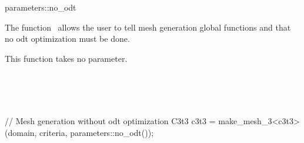 \ccRefPageBegin


\begin{ccRefFunction}{parameters::no_odt}  %


\ccDefinition
  
The function \ccRefName\ allows the user to tell mesh generation global functions
 and  that no odt optimization must be done.



\ccParameters

This function takes no parameter.

\ccSeeAlso

 \\
 \\
 \\


\ccExample

\begin{ccExampleCode}
// Mesh generation without odt optimization
C3t3 c3t3 = make_mesh_3<c3t3>(domain, criteria, parameters::no_odt());
\end{ccExampleCode}


\end{ccRefFunction}

\ccRefPageEnd

